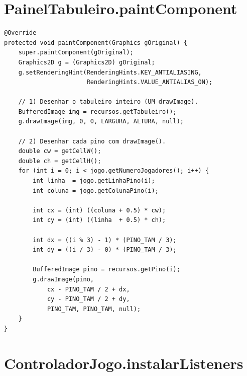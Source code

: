 \documentclass[12pt,a4paper]{report}
\begin{document}
\section{PainelTabuleiro.paintComponent}

\begin{lstlisting}
@Override
protected void paintComponent(Graphics gOriginal) {
    super.paintComponent(gOriginal);
    Graphics2D g = (Graphics2D) gOriginal;
    g.setRenderingHint(RenderingHints.KEY_ANTIALIASING,
                       RenderingHints.VALUE_ANTIALIAS_ON);

    // 1) Desenhar o tabuleiro inteiro (UM drawImage).
    BufferedImage img = recursos.getTabuleiro();
    g.drawImage(img, 0, 0, LARGURA, ALTURA, null);

    // 2) Desenhar cada pino com drawImage().
    double cw = getCellW();
    double ch = getCellH();
    for (int i = 0; i < jogo.getNumeroJogadores(); i++) {
        int linha  = jogo.getLinhaPino(i);
        int coluna = jogo.getColunaPino(i);

        int cx = (int) ((coluna + 0.5) * cw);
        int cy = (int) ((linha  + 0.5) * ch);

        int dx = ((i % 3) - 1) * (PINO_TAM / 3);
        int dy = ((i / 3) - 0) * (PINO_TAM / 3);

        BufferedImage pino = recursos.getPino(i);
        g.drawImage(pino,
            cx - PINO_TAM / 2 + dx,
            cy - PINO_TAM / 2 + dy,
            PINO_TAM, PINO_TAM, null);
    }
}
\end{lstlisting}

\section{ControladorJogo.instalarListeners}
\end{document}
